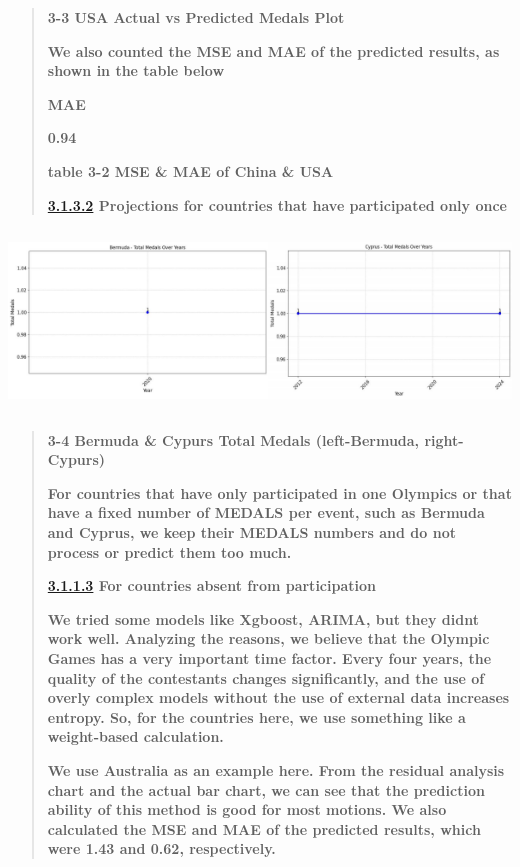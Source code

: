 \documentclass[12pt,a4paper]{article}
\renewenvironment{quote}{\begin{quotation}}{\end{quotation}}  %
\begin{document}
    \begin{quote}
    \textbf{3-3 USA Actual vs Predicted Medals Plot}
    
    \textbf{We also counted the MSE and MAE of the predicted results, as
    shown in the table below}
    
    \textbf{MAE}
    
    \textbf{0.94}
    
    \textbf{table 3-2 MSE \& MAE of China \& USA}
    
    \textbf{\url{3.1.3.2} Projections for countries that have participated
    only once}
    \end{quote}
    
    \includegraphics[width=6.12333in,height=1.905in]{./media/media/image12.png}
    
    \begin{quote}
    \textbf{3-4 Bermuda \& Cypurs Total Medals (left-Bermuda, right-Cypurs)}
    
    \textbf{For countries that have only participated in one Olympics or
    that have a fixed number of MEDALS per event, such as Bermuda and
    Cyprus, we keep their MEDALS numbers and do not process or predict them
    too much.}
    
    \textbf{\url{3.1.1.3} For countries absent from participation}
    
    \textbf{We tried some models like Xgboost, ARIMA, but they
    didn\textquotesingle t work well. Analyzing the reasons, we believe that
    the Olympic Games has a very important time factor. Every four years,
    the quality of the contestants changes significantly, and the use of
    overly complex models without the use of external data increases
    entropy. So, for the countries here, we use something like a
    weight-based calculation.}
    
    \textbf{We use Australia as an example here. From the residual analysis
    chart and the actual bar chart, we can see that the prediction ability
    of this method is good for most motions. We also calculated the MSE and
    MAE of the predicted results, which were 1.43 and 0.62, respectively.}
    \end{quote}
    
\end{document}
